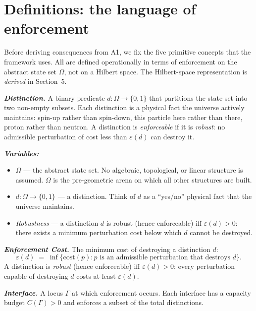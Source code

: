 \documentclass[11pt]{article}
\newenvironment{varlist}{\begin{itemize}[nosep,leftmargin=2em]}{\end{itemize}}
\begin{document}
\section{Definitions: the language of enforcement}
\label{sec:defs}

Before deriving consequences from A1, we fix the five primitive concepts that the framework uses.  All are defined operationally in terms of enforcement on the abstract state set $\Omega$, not on a Hilbert space.  The Hilbert-space representation is \emph{derived} in Section~5.

\begin{tcolorbox}[apfbox, title={Definitions (Distinction, Enforcement Cost, Interface, Admissible State, Capacity)}]
\textbf{\textit{Distinction.}} A binary predicate $d: \Omega \to \{0, 1\}$ that partitions the state set into two non-empty subsets.  Each distinction is a physical fact the universe actively maintains: spin-up rather than spin-down, this particle here rather than there, proton rather than neutron.  A distinction is \emph{enforceable} if it is \emph{robust}: no admissible perturbation of cost less than $\varepsilon(d)$ can destroy it.

\smallskip\noindent\textbf{\textit{Variables:}}
\begin{varlist}
\item $\Omega$ --- the abstract state set.  No algebraic, topological, or linear structure is assumed.  $\Omega$ is the pre-geometric arena on which all other structures are built.
\item $d: \Omega \to \{0,1\}$ --- a distinction.  Think of $d$ as a ``yes/no'' physical fact that the universe maintains.
\item \textit{Robustness} --- a distinction $d$ is robust (hence enforceable) iff $\varepsilon(d) > 0$: there exists a minimum perturbation cost below which $d$ cannot be destroyed.
\end{varlist}

\medskip
\textbf{\textit{Enforcement Cost.}} The minimum cost of destroying a distinction $d$:
\[
\varepsilon(d) \;=\; \inf\bigl\{\mathrm{cost}(p) : p \text{ is an admissible perturbation that destroys } d\bigr\}.
\]
A distinction is \emph{robust} (hence enforceable) iff $\varepsilon(d) > 0$: every perturbation capable of destroying $d$ costs at least $\varepsilon(d)$.

\medskip
\textbf{\textit{Interface.}} A locus $\Gamma$ at which enforcement occurs.  Each interface has a capacity budget $C(\Gamma) > 0$ and enforces a subset of the total distinctions.


\end{tcolorbox}
\end{document}
